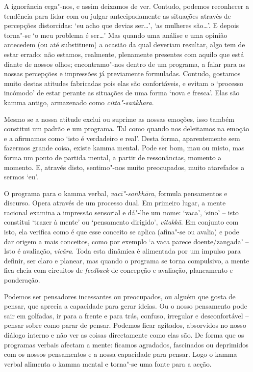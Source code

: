 A ignorância cega"-nos, e assim deixamos de ver. Contudo, podemos reconhecer a
tendência para lidar com ou julgar antecipadamente as situações através de
percepções distorcidas: `eu acho que devias ser\ldots', `as mulheres são\ldots'.
E depois torna"-se `o meu problema é ser\ldots' Mas quando uma análise e uma
opinião antecedem (ou até substituem) a ocasião da qual deveriam resultar, algo
tem de estar errado: não estamos, realmente, plenamente presentes com aquilo que
está diante de nossos olhos; encontramo"-nos dentro de um programa, a falar para
as nossas percepções e impressões já previamente formuladas. Contudo, gostamos
muito destas atitudes fabricadas pois elas são confortáveis, e evitam o
`processo incómodo' de estar perante as situações de uma forma `nova e fresca'.
Elas são kamma antigo, armazenado como \emph{citta"-saṅkhāra}.

Mesmo se a nossa atitude exclui ou suprime as nossas emoções, isso também
constitui um padrão e um programa. Tal como quando nos deleitamos na emoção e a
afirmamos como `isto é verdadeiro e real'. Desta forma, aparentemente sem
fazermos grande coisa, existe kamma mental. Pode ser bom, mau ou misto, mas
forma um ponto de partida mental, a partir de ressonâncias, momento a momento.
E, através disto, sentimo"-nos muito preocupados, muito atarefados a sermos `eu'.

O programa para o kamma verbal, \emph{vacī"-saṅkhāra}, formula pensamentos e
discurso. Opera através de um processo dual. Em primeiro lugar, a mente racional
examina a impressão sensorial e dá"-lhe um nome: `vaca', `sino' -- isto constitui
`trazer à mente' ou `pensamento dirigido', \emph{vitakkā}. Em conjunto com isto,
ela verifica como é que esse conceito se aplica (afina"-se ou avalia) e pode dar
origem a mais conceitos, como por exemplo `a vaca parece doente/zangada' -- Isto
é avaliação, \emph{vicāra}. Toda esta dinâmica é alimentada por um impulso para
definir, ser claro e planear, mas quando o programa se torna compulsivo, a mente
fica cheia com circuitos de \emph{feedback} de concepção e avaliação,
planeamento e ponderação.

\enlargethispage{\baselineskip}

Podemos ser pensadores incessantes ou preocupados, ou alguém que gosta de
pensar, que aprecia a capacidade para gerar ideias. Ou o nosso pensamento pode
sair em golfadas, ir para a frente e para trás, confuso, irregular e
desconfortável -- pensar sobre como parar de pensar. Podemos ficar agitados,
absorvidos no nosso diálogo interno e não ver as coisas directamente como elas
são. De forma que os programas verbais afectam a mente: ficamos agradados,
fascinados ou deprimidos com os nossos pensamentos e a nossa capacidade para
pensar. Logo o kamma verbal alimenta o kamma mental e torna"-se uma fonte para a
acção.

